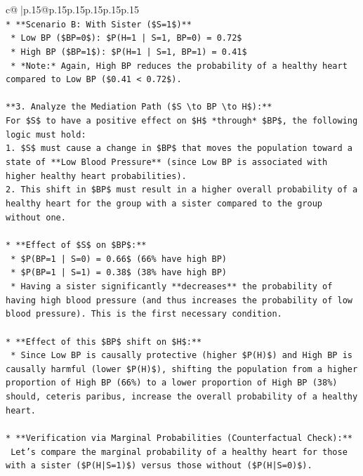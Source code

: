\documentclass{article}
\begin{document}
{\begin{supertabular}{c@{$\;$}|p{.15\linewidth}@{}p{.15\linewidth}p{.15\linewidth}p{.15\linewidth}p{.15\linewidth}p{.15\linewidth}}
{{{\\ 
\texttt{*   **Scenario B: With Sister (\$S=1\$)**} \\
\texttt{    *   Low BP (\$BP=0\$): \$P(H=1 | S=1, BP=0) = 0.72\$} \\
\texttt{    *   High BP (\$BP=1\$): \$P(H=1 | S=1, BP=1) = 0.41\$} \\
\texttt{    *   *Note:* Again, High BP reduces the probability of a healthy heart compared to Low BP (\$0.41 < 0.72\$).} \\
\\ 
\texttt{**3. Analyze the Mediation Path (\$S \textbackslash{}to BP \textbackslash{}to H\$):**} \\
\texttt{For \$S\$ to have a positive effect on \$H\$ *through* \$BP\$, the following logic must hold:} \\
\texttt{1.  \$S\$ must cause a change in \$BP\$ that moves the population toward a state of **Low Blood Pressure** (since Low BP is associated with higher healthy heart probabilities).} \\
\texttt{2.  This shift in \$BP\$ must result in a higher overall probability of a healthy heart for the group with a sister compared to the group without one.} \\
\\ 
\texttt{*   **Effect of \$S\$ on \$BP\$:**} \\
\texttt{    *   \$P(BP=1 | S=0) = 0.66\$ (66\% have high BP)} \\
\texttt{    *   \$P(BP=1 | S=1) = 0.38\$ (38\% have high BP)} \\
\texttt{    *   Having a sister significantly **decreases** the probability of having high blood pressure (and thus increases the probability of low blood pressure). This is the first necessary condition.} \\
\\ 
\texttt{*   **Effect of this \$BP\$ shift on \$H\$:**} \\
\texttt{    *   Since Low BP is causally protective (higher \$P(H)\$) and High BP is causally harmful (lower \$P(H)\$), shifting the population from a higher proportion of High BP (66\%) to a lower proportion of High BP (38\%) should, ceteris paribus, increase the overall probability of a healthy heart.} \\
\\ 
\texttt{*   **Verification via Marginal Probabilities (Counterfactual Check):**} \\
\texttt{    Let's compare the marginal probability of a healthy heart for those with a sister (\$P(H|S=1)\$) versus those without (\$P(H|S=0)\$).} \\
}}}
\end{supertabular}}
\end{document}
